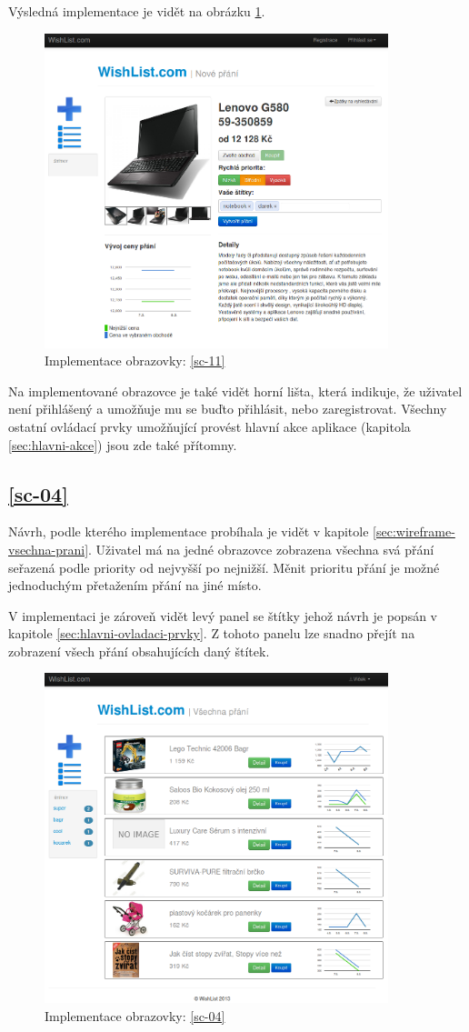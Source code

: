 Výsledná implementace je vidět na obrázku \ref{fig:impl-add}.
\begin{figure}[htb]
\begin{center}
\includegraphics[width=100mm]{./pictures/impl-add.png}
\caption{Implementace obrazovky: \ref{sc-11}}
\label{fig:impl-add}
\end{center}
\end{figure}

Na implementované obrazovce je také vidět horní lišta, která indikuje, že uživatel není přihlášený a umožňuje mu se buďto přihlásit, nebo zaregistrovat. Všechny ostatní ovládací prvky umožňující provést hlavní akce aplikace (kapitola \ref{sec:hlavni-akce}) jsou zde také přítomny.

\subsection{\ref{sc-04}}
Návrh, podle kterého implementace probíhala je vidět v kapitole \ref{sec:wireframe-vsechna-prani}. Uživatel má na jedné obrazovce zobrazena všechna svá přání seřazená podle priority od nejvyšší po nejnižší. Měnit prioritu přání je možné jednoduchým přetažením přání na jiné místo.

V implementaci je zároveň vidět levý panel se štítky jehož návrh je popsán v kapitole \ref{sec:hlavni-ovladaci-prvky}. Z tohoto panelu lze snadno přejít na zobrazení všech přání obsahujících daný štítek.

\begin{figure}[htb]
\begin{center}
\includegraphics[width=100mm]{./pictures/impl-all.png}
\caption{Implementace obrazovky: \ref{sc-04}}
\label{fig:impl-all}
\end{center}
\end{figure}